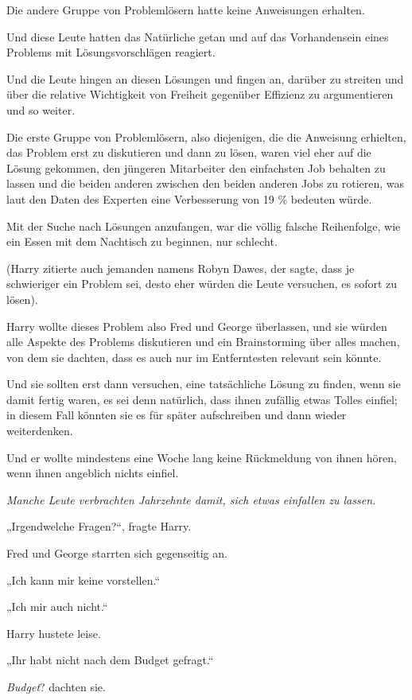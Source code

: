 {Die andere Gruppe von Problemlösern hatte keine Anweisungen erhalten.

Und diese Leute hatten das Natürliche getan und auf das Vorhandensein eines Problems mit Lösungsvorschlägen reagiert.

Und die Leute hingen an diesen Lösungen und fingen an, darüber zu streiten und über die relative Wichtigkeit von Freiheit gegenüber Effizienz zu argumentieren und so weiter.

Die erste Gruppe von Problemlösern, also diejenigen, die die Anweisung erhielten, das Problem erst zu diskutieren und dann zu lösen, waren viel eher auf die Lösung gekommen, den jüngeren Mitarbeiter den einfachsten Job behalten zu lassen und die beiden anderen zwischen den beiden anderen Jobs zu rotieren, was laut den Daten des Experten eine Verbesserung von 19 \% bedeuten würde.

Mit der Suche nach Lösungen anzufangen, war die völlig falsche Reihenfolge, wie ein Essen mit dem Nachtisch zu beginnen, nur schlecht.

(Harry zitierte auch jemanden namens Robyn Dawes, der sagte, dass je schwieriger ein Problem sei, desto eher würden die Leute versuchen, es sofort zu lösen).

Harry wollte dieses Problem also Fred und George überlassen, und sie würden alle Aspekte des Problems diskutieren und ein Brainstorming über alles machen, von dem sie dachten, dass es auch nur im Entferntesten relevant sein könnte.

Und sie sollten erst dann versuchen, eine tatsächliche Lösung zu finden, wenn sie damit fertig waren, es sei denn natürlich, dass ihnen zufällig etwas Tolles einfiel; in diesem Fall könnten sie es für später aufschreiben und dann wieder weiterdenken.

Und er wollte mindestens eine Woche lang keine Rückmeldung von ihnen hören, wenn ihnen angeblich nichts einfiel.

\emph{Manche Leute verbrachten Jahrzehnte damit, sich etwas einfallen zu lassen.}

„Irgendwelche Fragen?“, fragte Harry.

Fred und George starrten sich gegenseitig an.

„Ich kann mir keine vorstellen.“

„Ich mir auch nicht.“

Harry hustete leise.

„Ihr habt nicht nach dem Budget gefragt.“

\emph{Budget}? dachten sie.

}
